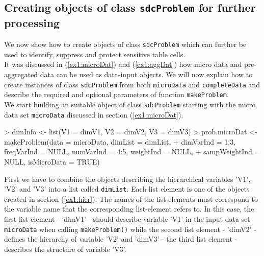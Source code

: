 \documentclass{article}
\begin{document}
\subsection{Creating objects of class {\tt sdcProblem} for further processing}
\label{ex1:makeProb}

We now show how to create objects of class {\tt sdcProblem} which can further
be used to identify, suppress and protect sensitive table cells. \\

It was discussed in (\ref{ex1:microDat}) and (\ref{ex1:aggDat}) how 
micro data and pre-aggregated data can be used as data-input objects. We will now
explain how to create instances of class {\tt sdcProblem} from both  {\tt microData} 
and {\tt completeData} and describe the required and optional parameters of 
function {\tt makeProblem}.\\

We start building an suitable object of class {\tt sdcProblem} starting with 
the micro data set {\tt microData} discussed in section (\ref{ex1:microDat}).
\begin{Schunk}
\begin{Sinput}
> dimInfo <- list(V1 = dimV1, V2 = dimV2, V3 = dimV3)
> prob.microDat <- makeProblem(data = microData, dimList = dimList, 
+     dimVarInd = 1:3, freqVarInd = NULL, numVarInd = 4:5, weightInd = NULL, 
+     sampWeightInd = NULL, isMicroData = TRUE)
\end{Sinput}
\end{Schunk}

First we have to combine the objects describing the hierarchical variables 'V1',
'V2' and 'V3' into a list called {\tt dimList}. Each list element is one of the
objects created in section (\ref{ex1:hier}). The names of the list-elements must
correspond to the variable name that the corresponding list-element refers to. In
this case, the first list-element - 'dimV1' - should describe variable 'V1' in 
the input data set {\tt microData} when calling {\tt makeProblem()} while the
second list element - 'dimV2' - defines the hierarchy of variable 'V2' and 'dimV3' 
- the third list element - describes the structure of variable 'V3'.\\
\end{document}
